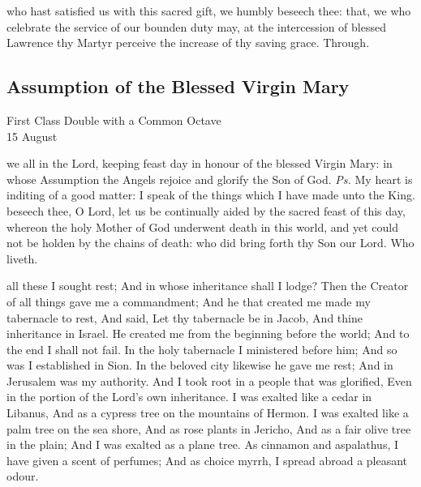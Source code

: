 \postcommunion
{} who hast satisfied us with this sacred gift, we humbly beseech thee: that, we who celebrate the service of our bounden duty may, at the intercession of blessed Lawrence thy Martyr perceive the increase of thy saving grace. Through.


\subsection{Assumption of the Blessed Virgin Mary}
\begin{inhead}
    {First Class Double with a Common Octave\\
15 August}
\end{inhead}

\introit
{} we all in the Lord, keeping feast day in honour of the blessed Virgin Mary: in whose Assumption the Angels rejoice and glorify the Son of God. \textit{Ps.} My heart is inditing of a good matter: I speak of the things which I have made unto the King.
\collect
{} beseech thee, O Lord, let us be continually aided by the sacred feast of this day, whereon the holy Mother of God underwent death in this world, and yet could not be holden by the chains of death: who did bring forth thy Son our Lord. Who liveth.

 all these I sought rest; And in whose inheritance shall I lodge? Then the Creator of all things gave me a commandment; And he that created me made my tabernacle to rest, And said, Let thy tabernacle be in Jacob, And thine inheritance in Israel. He created me from the beginning before the world; And to the end I shall not fail. In the holy tabernacle I ministered before him; And so was I established in Sion. In the beloved city likewise he gave me rest; And in Jerusalem was my authority. And I took root in a people that was glorified, Even in the portion of the Lord’s own inheritance. I was exalted like a cedar in Libanus, And as a cypress tree on the mountains of Hermon. I was exalted like a palm tree on the sea shore, And as rose plants in Jericho, And as a fair olive tree in the plain; And I was exalted as a plane tree. As cinnamon and aspalathus, I have given a scent of perfumes; And as choice myrrh, I spread abroad a pleasant odour.


